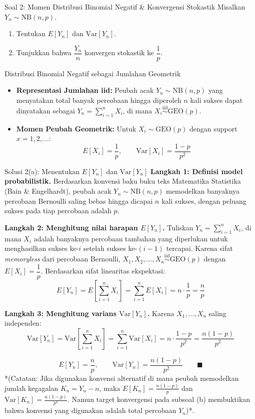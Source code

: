 \documentclass[10pt,twoside]{article}
\begin{document}
\begin{soalbox}{Soal 2: Momen Distribusi Binomial Negatif \& Konvergensi Stokastik}
Misalkan $Y_n \sim \text{NB}(n, p)$.
\begin{enumerate}[label=(\alph*)]
  \item Tentukan $E[Y_n]$ dan $\text{Var}[Y_n]$.
  \item Tunjukkan bahwa $\dfrac{Y_n}{n}$ konvergen stokastik ke $\dfrac{1}{p}$.
\end{enumerate}
\end{soalbox}

\begin{tipbox}{Distribusi Binomial Negatif sebagai Jumlahan Geometrik}
\begin{itemize}
  \item \textbf{Representasi Jumlahan iid:} Peubah acak $Y_n \sim \text{NB}(n, p)$ yang menyatakan total banyak percobaan hingga diperoleh $n$ kali sukses dapat dinyatakan sebagai $Y_n = \sum_{i=1}^n X_i$, di mana $X_i \overset{\mathrm{iid}}{\sim} \text{GEO}(p)$.
  \item \textbf{Momen Peubah Geometrik:} Untuk $X_i \sim \text{GEO}(p)$ dengan support $x = 1, 2, \dots$:
  \[
  E[X_i] = \frac{1}{p}, \qquad \mathrm{Var}[X_i] = \frac{1-p}{p^2}
  \]
\end{itemize}
\end{tipbox}

\begin{solbox}{Solusi 2(a): Menentukan $E[Y_n]$ dan $\mathrm{Var}[Y_n]$}
\textbf{Langkah 1: Definisi model probabilistik.}
Berdasarkan konvensi baku buku teks Matematika Statistika (Bain \& Engelhardt), peubah acak $Y_n \sim \text{NB}(n, p)$ memodelkan banyaknya percobaan Bernoulli saling bebas hingga dicapai $n$ kali sukses, dengan peluang sukses pada tiap percobaan adalah $p$.

\textbf{Langkah 2: Menghitung nilai harapan $E[Y_n]$.}
Tuliskan $Y_n = \sum_{i=1}^n X_i$, di mana $X_i$ adalah banyaknya percobaan tambahan yang diperlukan untuk menghasilkan sukses ke-$i$ setelah sukses ke-$(i-1)$ tercapai.
Karena sifat \textit{memoryless} dari percobaan Bernoulli, $X_1, X_2, \dots, X_n \overset{\mathrm{iid}}{\sim} \text{GEO}(p)$ dengan $E[X_i] = \dfrac{1}{p}$.
Berdasarkan sifat linearitas ekspektasi:
\[
E[Y_n] = E\left[\sum_{i=1}^n X_i\right] = \sum_{i=1}^n E[X_i] = n \cdot \frac{1}{p} = \frac{n}{p}
\]

\textbf{Langkah 3: Menghitung varians $\mathrm{Var}[Y_n]$.}
Karena $X_1, \dots, X_n$ saling independen:
\[
\mathrm{Var}[Y_n] = \mathrm{Var}\left[\sum_{i=1}^n X_i\right] = \sum_{i=1}^n \mathrm{Var}[X_i] = n \cdot \frac{1-p}{p^2} = \frac{n(1-p)}{p^2}
\]

\[
\boxed{E[Y_n] = \frac{n}{p}, \qquad \mathrm{Var}[Y_n] = \frac{n(1-p)}{p^2}} \qquad \blacksquare
\]
*(Catatan: Jika digunakan konvensi alternatif di mana peubah memodelkan jumlah kegagalan $K_n = Y_n - n$, maka $E[K_n] = \frac{n(1-p)}{p}$ dan $\mathrm{Var}[K_n] = \frac{n(1-p)}{p^2}$. Namun target konvergensi pada subsoal (b) membuktikan bahwa konvensi yang digunakan adalah total percobaan $Y_n$)*.
\end{solbox}
\end{document}
